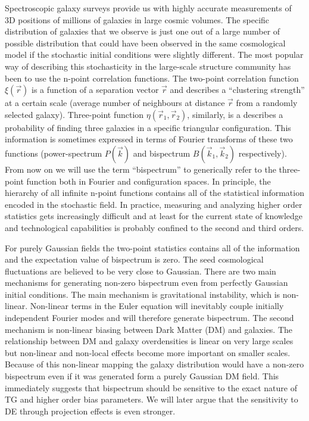 Spectroscopic galaxy surveys provide us with highly accurate measurements of 3D positions of millions of galaxies in large cosmic volumes.
The specific distribution of galaxies that we observe is just one out of a large number of possible distribution that could have been
observed in the same cosmological model if the stochastic initial conditions were slightly different. The most popular way of describing
this stochasticity in the large-scale structure community has been to use the n-point correlation functions. The two-point correlation function
$\xi(\vec{r})$ is a function of a separation vector $\vec{r}$ and describes a ``clustering strength'' at a certain scale (average number of neighbours at distance
$\vec{r}$ from a randomly selected galaxy). Three-point function $\eta(\vec{r}_1, \vec{r}_2)$, similarly, is a describes a probability of finding three galaxies 
in a specific triangular configuration. This information is sometimes expressed in terms of Fourier transforms of these two functions 
(power-spectrum $P(\vec{k})$ and bispectrum $B(\vec{k}_1, \vec{k}_2)$ respectively). From now on we will use the term ``bispectrum'' to generically refer to the
three-point function both in Fourier and configuration spaces. In principle, the hierarchy of all infinite n-point functions contains all of the statistical
information encoded in the stochastic field. In practice, measuring and analyzing higher order statistics gets increasingly difficult and at least for the current
state of knowledge and technological capabilities is probably confined to the second and third orders.

For purely Gaussian fields the two-point statistics contains all of the information and the expectation value of bispectrum is zero. 
The seed cosmological fluctuations are believed to be very close to Gaussian. There are two main mechanisms for generating non-zero
bispectrum even from perfectly Gaussian initial conditions. The main mechanism is gravitational instability, which is non-linear. 
Non-linear terms in the Euler equation will inevitably couple initially independent Fourier modes and will therefore generate bispectrum.
The second mechanism is non-linear biasing between Dark Matter (DM) and galaxies. The relationship between DM and galaxy overdensities 
is linear on very large scales but non-linear and non-local effects become more important on smaller scales. Because of this non-linear mapping
the galaxy distribution would have a non-zero bispectrum even if it was generated form a purely Gaussian DM field. This immediately suggests that
bispectrum should be sensitive to the exact nature of TG and higher order bias parameters. We will later argue that the sensitivity to DE 
through projection effects is even stronger.

